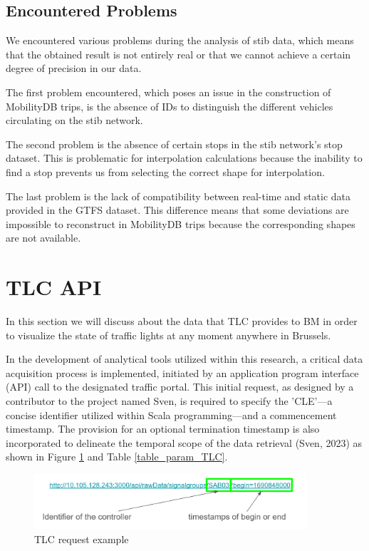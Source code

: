 \documentclass[12pt]{report}
\begin{document}
	
	
	\subsection{Encountered Problems}
	\label{sec:EncouteredProblemsTIB}
	
	We encountered various problems during the analysis of \acrshort{stib} data, which means that the obtained result is not entirely real or that we cannot achieve a certain degree of precision in our data.
	
	The first problem encountered, which poses an issue in the construction of MobilityDB trips, is the absence of IDs to distinguish the different vehicles circulating on the \acrshort{stib} network.
	
	The second problem is the absence of certain stops in the \acrshort{stib} network's stop dataset. This is problematic for interpolation calculations because the inability to find a stop prevents us from selecting the correct shape for interpolation.
	
	The last problem is the lack of compatibility between real-time and static data provided in the GTFS dataset. This difference means that some deviations are impossible to reconstruct in MobilityDB trips because the corresponding shapes are not available.
	
	\section{TLC API}
	
	In this section we will discuss about the  data that TLC provides to BM in order to visualize the state of traffic lights at any moment anywhere in Brussels.
	
	In the development of analytical tools utilized within this research, a critical data acquisition process is implemented, initiated by an application program interface (API) call to the designated traffic portal. This initial request, as designed by a contributor to the project named Sven, is required to specify the 'CLE'—a concise identifier utilized within Scala programming—and a commencement timestamp. The provision for an optional termination timestamp is also incorporated to delineate the temporal scope of the data retrieval (Sven, 2023) as shown in Figure \ref{TLCRequest} and Table \ref{table_param_TLC}.
	
	\begin{center}
		\begin{figure}
			\centering
			\includegraphics[width=0.9\textwidth]{images/TLCRequest.png}
			\caption{TLC request example}
			\label{TLCRequest}
		\end{figure}
	\end{center}
	
\end{document}
